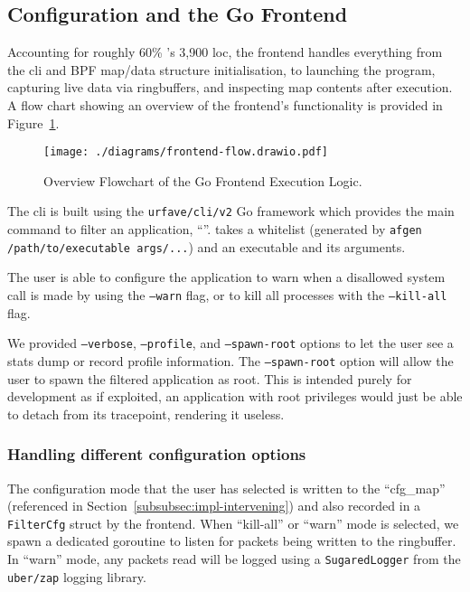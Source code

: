 \subsection{Configuration and the Go Frontend}\label{subsec:impl-frontend}

Accounting for roughly 60\% \af's 3,900 \ac{loc}, the frontend handles 
everything from the \ac{cli} and BPF map/data structure initialisation, to 
launching the program, capturing live data via ringbuffers, and inspecting 
map contents after execution. A flow chart showing an overview of the frontend's
functionality is provided in Figure~\ref{fig:frontend-flowchart}.

\begin{figure}[h]
\centering
\texttt{[image: ./diagrams/frontend-flow.drawio.pdf]}
\caption{Overview Flowchart of the Go Frontend Execution Logic.}
\label{fig:frontend-flowchart}
\end{figure}

The \ac{cli} is built using the \texttt{urfave/cli/v2} Go framework which provides
the main command to filter an application, ``\af''. \af takes a whitelist
(generated by \texttt{afgen /path/to/executable args/...}) and an
executable and its arguments. 

The user is able to configure the application to warn when a disallowed system call
is made by using the \texttt{--warn} flag, or to kill all processes with the
\texttt{--kill-all} flag. 

We provided \texttt{--verbose}, \texttt{--profile}, and \texttt{--spawn-root}
options to let the user see a stats dump or record profile information. The
\texttt{--spawn-root} option will allow the user to spawn the filtered
application as root. This is intended purely for development as if exploited,
an application with root privileges would just be able to detach \af from its
tracepoint, rendering it useless.


\subsubsection{Handling different configuration options}

The configuration mode that the user has selected is written to the
``cfg\_map'' (referenced in Section~\ref{subsubsec:impl-intervening}) and also
recorded in a \texttt{FilterCfg} struct by the frontend. When ``kill-all'' or
``warn'' mode is selected, we spawn a dedicated goroutine to listen for packets
being written to the ringbuffer. In ``warn'' mode, any packets read will be
logged using a \texttt{SugaredLogger} from the \texttt{uber/zap} logging
library. 

